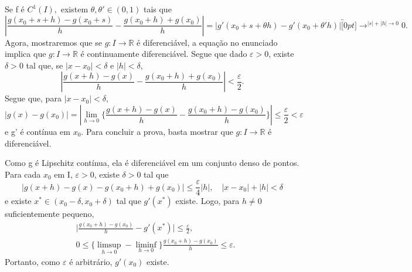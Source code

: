 \documentclass[Analysis/analysis_notes.tex]{subfiles}
\begin{document}
\begin{proof*}
	Se f é \(C^{1}(I),\) existem \(\theta , \theta '\in(0, 1)\) tais que
	\[
		|\frac{g(x_{0}+s+h)-g(x_{0}+s)}{h}-\frac{g(x_{0}+h)+g(x_{0})}{h}| = |g'(x_{0}+s+\theta h)-g'(x_{0}+\theta 'h)|\overbracket[0pt]{\longrightarrow}^{|s|+|h|\to 0}0.
	\]
	Agora, mostraremos que se \(g:I\rightarrow \mathbb{R}\) é diferenciável, a equa\c cão
	no enunciado implica que \(g:I\rightarrow \mathbb{R}\) é continuamente diferenciável. Segue que
	dado \(\varepsilon >0\), existe \(\delta >0\) tal que, se \(|x-x_{0}| < \delta \) e \(|h| < \delta ,\)
	\[
		|\frac{g(x+h)-g(x)}{h}-\frac{g(x_{0}+h)+g(x_{0})}{h}| < \frac{\varepsilon }{2}.
	\]
	Segue que, para \(|x-x_{0}| < \delta ,\)
	\[
		|g(x)-g(x_{0})| = |\lim_{h\to 0}\biggl\{\frac{g(x+h)-g(x)}{h}-\frac{g(x_{0}+h)-g(x_{0})}{h}\biggr\}|\leq \frac{\varepsilon }{2} < \varepsilon
	\]
	e g' é contínua em \(x_{0}.\) Para concluir a prova, basta mostrar que \(g:I\rightarrow \mathbb{R}\) é diferenciável.

	Como g é Lipschitz contínua, ela é diferenciável em um conjunto denso de pontos.
	Para cada \(x_{0}\) em I, \(\varepsilon >0\), existe \(\delta >0\) tal que
	\[
		|g(x+h)-g(x)-g(x_{0}+h)+g(x_{0})|\leq \frac{\varepsilon }{4}|h|,\quad|x-x_{0}|+|h|<\delta
	\]
	e existe \(x^{*}\in(x_{0}-\delta ,x_{0}+\delta )\) tal que \(g'(x^{*})\) existe.
	Logo, para \(h\neq0\) suficientemente pequeno,
	\begin{align*}
		 & \biggl|\frac{g(x_{0}+h)-g(x_{0})}{h}-g'(x^{*})\biggr|\leq \frac{\varepsilon }{2},                      \\
		 & 0\leq \biggl\{\limsup_{h\to 0}-\liminf_{h\to 0}\biggr\}\frac{g(x_{0}+h)-g(x_{0})}{h}\leq \varepsilon .
	\end{align*}
	Portanto, como \(\varepsilon\) é arbitrário, \(g'(x_{0})\) existe. \qedsymbol
\end{proof*}
\end{document}
